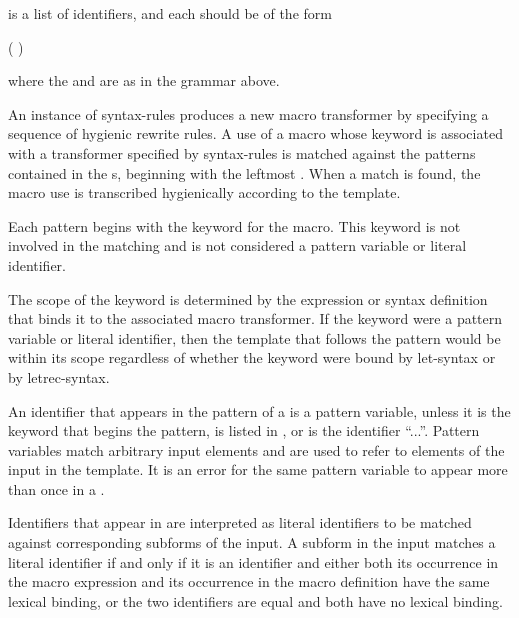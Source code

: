 \begin{entry}{%
}

\syntax
{} is a list of identifiers, and each 
should be of the form
\begin{scheme}
( )%
\end{scheme}
where the  and  are as in the grammar
above.

\semantics An instance of {\cf syntax-rules} produces a new macro
transformer by specifying a sequence of hygienic rewrite rules.  A use
of a macro whose keyword is associated with a transformer specified by
{\cf syntax-rules} is matched against the patterns contained in the
s, beginning with the leftmost .
When a match is found, the macro use is transcribed hygienically
according to the template.

Each pattern begins with the keyword for the macro.  This keyword
is not involved in the matching and is not considered a pattern
variable or literal identifier.

\begin{rationale}
The scope of the keyword is determined by the expression or syntax
definition that binds it to the associated macro transformer.
If the keyword were a pattern variable or literal identifier, then
the template that follows the pattern would be within its scope
regardless of whether the keyword were bound by {\cf let-syntax}
or by {\cf letrec-syntax}.
\end{rationale}

An identifier that appears in the pattern of a  is
a pattern variable, unless it is the keyword that begins the pattern,
is listed in , or is the identifier ``{\cf ...}''.
Pattern variables match arbitrary input elements and
are used to refer to elements of the input in the template.  It is an
error for the same pattern variable to appear more than once in a
.

Identifiers that appear in  are interpreted as literal
identifiers to be matched against corresponding subforms of the input.
A subform
in the input matches a literal identifier if and only if it is an
identifier
and either both its occurrence in the macro expression and its
occurrence in the macro definition have the same lexical binding, or
the two identifiers are equal and both have no lexical binding.


\end{entry}
